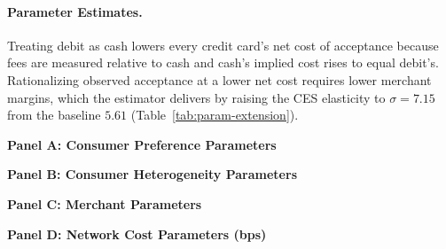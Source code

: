 \documentclass[main.tex]{subfiles}
\begin{document}
\paragraph{Parameter Estimates.}

Treating debit as cash lowers every credit card's net cost of acceptance because fees are measured relative to cash and cash's implied cost rises to equal debit's.
Rationalizing observed acceptance at a lower net cost requires lower merchant margins, which the estimator delivers by raising the CES elasticity to $\sigma = 7.15$ from the baseline $5.61$ (Table~\ref{tab:param-extension}).

\begin{table}[ht!]
    \small
    \caption{Estimated parameters: Debit as cash}
    \label{tab:param-extension}
\begin{center}\setlength{\tabcolsep}{4pt} \begin{minipage}[t]{0.5\columnwidth}%
\centering \textbf{Panel A: Consumer Preference Parameters} \par\medskip 
\end{minipage}%
\begin{minipage}[t]{0.5\columnwidth}%
\centering \textbf{Panel B: Consumer Heterogeneity Parameters} \par\medskip 
\end{minipage}

\vspace{0.5em}

\begin{minipage}[t]{0.5\columnwidth}%
\centering \textbf{Panel C: Merchant Parameters} \par\medskip 
\end{minipage}%
\begin{minipage}[t]{0.5\columnwidth}%
\centering \textbf{Panel D: Network Cost Parameters (bps)} \par\medskip 
\end{minipage}
\end{center}
\end{table}
\end{document}
